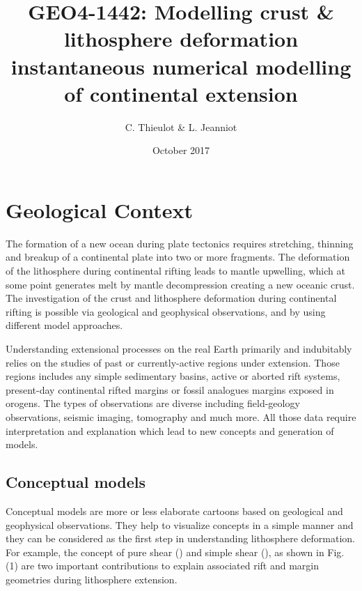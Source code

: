 \documentclass[a4paper]{article}
\title{GEO4-1442: Modelling crust \& lithosphere deformation \\ instantaneous numerical modelling of continental extension}
\author{C. Thieulot \& L. Jeanniot}
\date{October 2017}
\begin{document}
\maketitle

\tableofcontents

\vspace{1cm}




\newpage
\section{Geological Context}

The formation of a new ocean during plate tectonics requires stretching, thinning and breakup of a continental plate into two or more fragments. The deformation of the lithosphere during continental rifting leads to mantle upwelling, which at some point generates melt by mantle decompression creating a new oceanic crust. The investigation of the crust and lithosphere deformation during continental rifting is possible via geological and geophysical observations, and by using different model approaches.

Understanding extensional processes on the real Earth primarily and indubitably relies on the studies of past or currently-active regions under extension. Those regions includes any simple sedimentary basins, active or aborted rift systems, present-day continental rifted margins or fossil analogues margins exposed in orogens. The types of observations are diverse including field-geology observations, seismic imaging, tomography and much more. All those data require interpretation and explanation which lead to new concepts and generation of models. 

\subsection{Conceptual models}

Conceptual models are more or less elaborate cartoons based on geological and geophysical observations. They help to visualize concepts in a simple manner and they can be considered as the first step in understanding lithosphere deformation. For example, the concept of pure shear (\cite{mcke78}) and simple shear (\cite{webu86}), as shown in Fig. (1) are two important contributions to explain associated rift and margin geometries during lithosphere extension. \cite{fort81}
\end{document}
